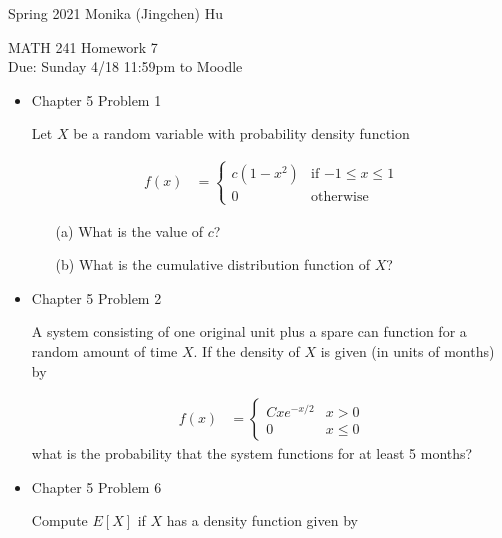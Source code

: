\documentclass[11pt]{article}
\begin{document}
\enlargethispage{\baselineskip}

Spring 2021 \hfill Monika (Jingchen) Hu\\

\begin{center}
{\huge MATH 241 Homework 7}	\\
Due: Sunday 4/18 11:59pm to Moodle
\end{center}
\vspace{0.5cm}


\begin{itemize}

    \item
    Chapter 5 Problem 1
    
    Let $X$ be a random variable with probability density function
     
   \begin{align*}
   f(x) &= \begin{cases}
   c (1 - x^2)& \text{if $-1 \leq x \leq 1$} \\
   0 & \text{otherwise}
   \end{cases}
   \end{align*}
   
   \begin{itemize}
   \item[(a)] What is the value of $c$?
   \item[(b)] What is the cumulative distribution function of $X$?
   \end{itemize}
   
    \item
    Chapter 5 Problem 2
    
    A system consisting of one original unit plus a spare can function for a random amount of time $X$. If the density of $X$ is given (in units of months) by
    
   \begin{align*}
   f(x) &= \begin{cases}
   C x e^{-x/2} & x > 0\\
   0 & x \leq 0
   \end{cases}
   \end{align*}
   what is the probability that the system functions for at least 5 months?
   
    \item
    Chapter 5 Problem  6
    
    Compute $E[X]$ if $X$ has a density function given by
    

\end{itemize}
\end{document}
